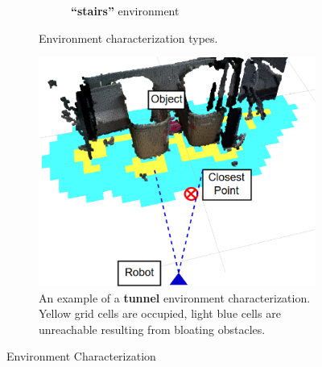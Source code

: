 \documentclass[12pt]{article}
\begin{document}
\begin{figure}
\begin{subfigure}[t]{0.45\columnwidth}
\begin{subfigure}[t]{0.45\columnwidth}
        \caption{\textbf{``stairs''} environment}
    \end{subfigure}
      \caption{Environment characterization types.}
      \label{fig:characters}
\end{subfigure}
%
\begin{subfigure}{0.5\columnwidth}
\begin{center}
\includegraphics[width=\columnwidth]{images/characterization.png}
\caption{An example of a \textbf{tunnel} environment characterization. Yellow grid cells are occupied, light blue cells are unreachable resulting from bloating obstacles.}
\label{fig:characterization}
\end{center}
\end{subfigure}
\caption{Environment Characterization}
\end{figure}
\end{document}
